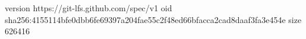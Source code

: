 version https://git-lfs.github.com/spec/v1
oid sha256:4155114bfe0dbb6fe69397a204fae55c2f48ed66bfacca2cad8daaf3fa3e454e
size 626416
